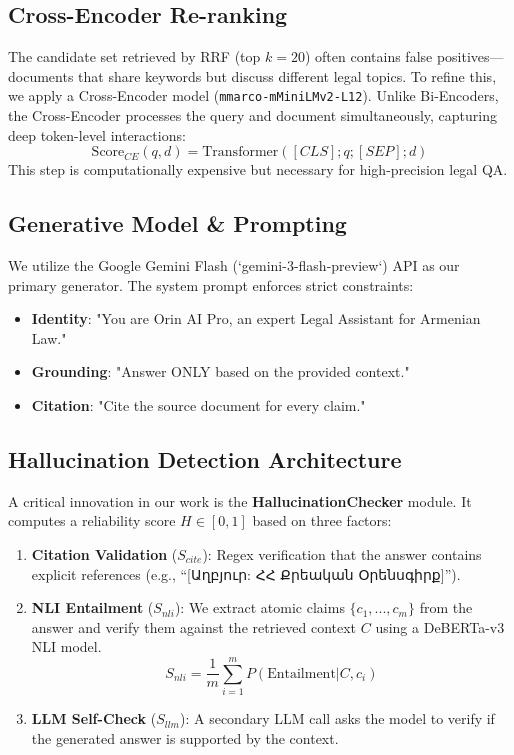 \documentclass[11pt]{article}
\begin{document}
\subsection{Cross-Encoder Re-ranking}
The candidate set retrieved by RRF (top $k=20$) often contains false positives—documents that share keywords but discuss different legal topics. To refine this, we apply a Cross-Encoder model (\texttt{mmarco-mMiniLMv2-L12}).
Unlike Bi-Encoders, the Cross-Encoder processes the query and document simultaneously, capturing deep token-level interactions:
\begin{equation}
    \text{Score}_{CE}(q, d) = \text{Transformer}([CLS] ; q ; [SEP] ; d)
\end{equation}
This step is computationally expensive but necessary for high-precision legal QA.

\subsection{Generative Model \& Prompting}
We utilize the Google Gemini Flash (`gemini-3-flash-preview`) API as our primary generator. The system prompt enforces strict constraints:
\begin{itemize}
    \item \textbf{Identity}: "You are Orin AI Pro, an expert Legal Assistant for Armenian Law."
    \item \textbf{Grounding}: "Answer ONLY based on the provided context."
    \item \textbf{Citation}: "Cite the source document for every claim."
\end{itemize}

\subsection{Hallucination Detection Architecture}
A critical innovation in our work is the \textbf{HallucinationChecker} module. It computes a reliability score $H \in [0, 1]$ based on three factors:

\begin{enumerate}
    \item \textbf{Citation Validation} ($S_{cite}$): Regex verification that the answer contains explicit references (e.g., ``[Աղբյուր: ՀՀ Քրեական Օրենսգիրք]'').
    \item \textbf{NLI Entailment} ($S_{nli}$): We extract atomic claims $\{c_1, ..., c_m\}$ from the answer and verify them against the retrieved context $C$ using a DeBERTa-v3 NLI model.
    \begin{equation}
        S_{nli} = \frac{1}{m} \sum_{i=1}^{m} P(\text{Entailment} | C, c_i)
    \end{equation}
    \item \textbf{LLM Self-Check} ($S_{llm}$): A secondary LLM call asks the model to verify if the generated answer is supported by the context.
\end{enumerate}
\end{document}
